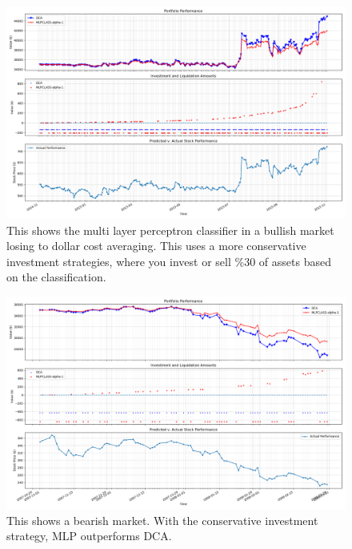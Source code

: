 \documentclass[12pt]{article}
\begin{document}
\begin{figure}
	\centering
	\includegraphics[width=0.7\linewidth]{../Results/GOOG-DCA-MLPCLASS-2014-11-02--2015-11-02--performanceplot}
	\caption{This shows the multi layer perceptron classifier in a bullish market losing to dollar cost averaging. This uses a more conservative investment strategies, where you invest or sell \%30 of assets based on the classification.}
	\label{fig:goog-dca-mlpclass-2014-11-02--2015-11-02--performanceplot}
\end{figure}



\begin{figure}
	\centering
	\includegraphics[width=0.7\linewidth]{../Results/GOOG-DCA-MLPCLASS-2007-11-01--2008-03-01--performanceplot}
	\caption{This shows a bearish market. With the conservative investment strategy, MLP outperforms DCA.}
	\label{fig:goog-dca-mlpclass-2007-11-01--2008-03-01--performanceplot}
\end{figure}
\end{document}
